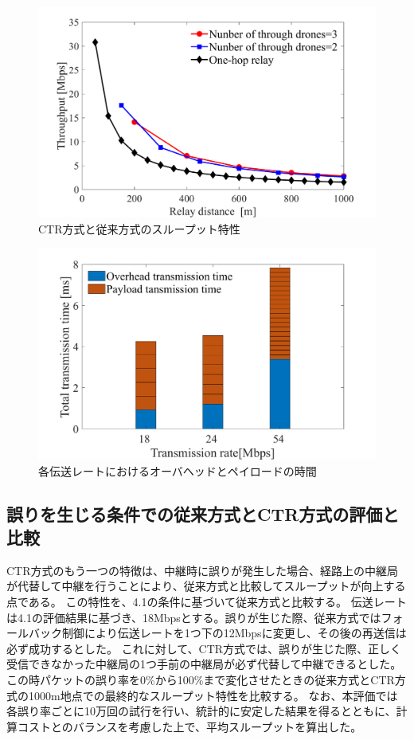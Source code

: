 \documentclass[a4paper,10.5pt]{ltjsarticle}
\begin{document}
\begin{figure}[H]
  \centering
  \includegraphics[width=\linewidth]{throughtput_vs_placement_50m_max_distance_3.pdf} %
  \caption{CTR方式と従来方式のスループット特性}
  \label{fig:throughput_through} %
\end{figure}
\begin{figure}[H]
  \centering
  \includegraphics[width=\linewidth]{throughtput_vs_placement_50m_max_distance_3_2.pdf} %
  \caption{各伝送レートにおけるオーバヘッドとペイロードの時間}
  \label{fig:overhead_vs_paylord} %
\end{figure}

\clearpage
\subsection{誤りを生じる条件での従来方式とCTR方式の評価と比較}
CTR方式のもう一つの特徴は、中継時に誤りが発生した場合、経路上の中継局が代替して中継を行うことにより、従来方式と比較してスループットが向上する点である。
この特性を、4.1の条件に基づいて従来方式と比較する。
伝送レートは4.1の評価結果に基づき、18Mbpsとする。誤りが生じた際、従来方式ではフォールバック制御により伝送レートを1つ下の12Mbpsに変更し、その後の再送信は必ず成功するとした。
これに対して、CTR方式では、誤りが生じた際、正しく受信できなかった中継局の1つ手前の中継局が必ず代替して中継できるとした。
この時パケットの誤り率を0\%から100\%まで変化させたときの従来方式とCTR方式の1000m地点での最終的なスループット特性を比較する。
なお、本評価では各誤り率ごとに10万回の試行を行い、統計的に安定した結果を得るとともに、計算コストとのバランスを考慮した上で、平均スループットを算出した。
\end{document}
